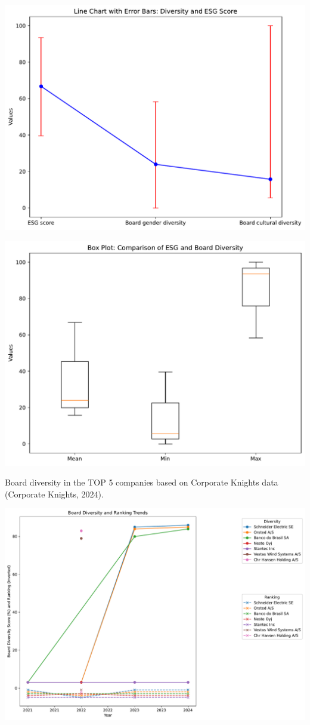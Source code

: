 \documentclass[
  letterpaper,
  DIV=11,
  numbers=noendperiod]{scrartcl}
\begin{document}
\includegraphics{_thesis_files/figure-pdf/cell-52-output-2.pdf}

\includegraphics{_thesis_files/figure-pdf/cell-52-output-3.pdf}

Board diversity in the TOP 5 companies based on Corporate Knights data
(Corporate Knights, 2024).

\includegraphics{_thesis_files/figure-pdf/cell-53-output-1.pdf}
\end{document}
